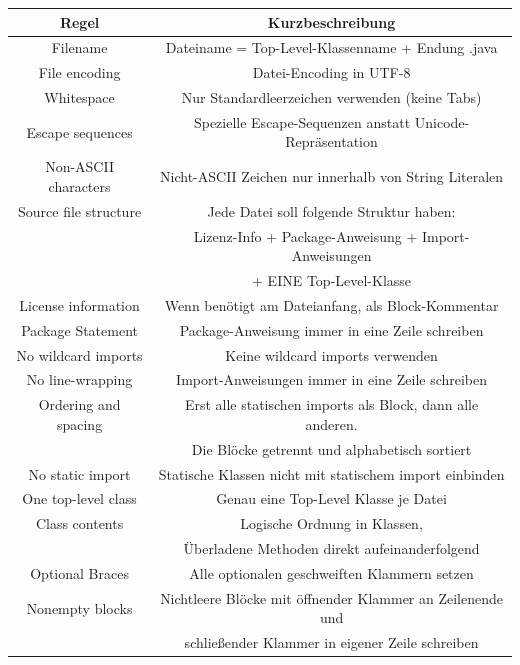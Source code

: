 \documentclass[da,ngerman]{stthesis}
\begin{document}
				\begin{center}
					\tabulinesep=1.5mm
					\begin{longtabu}{|c|c|}
						\hline
  						\textbf{Regel} & \textbf{Kurzbeschreibung}\\
  						\hline
  												\hline
						Filename & Dateiname = Top-Level-Klassenname + Endung .java \\
						\hline
						File encoding & Datei-Encoding in UTF-8 \\
						\hline
						Whitespace & Nur Standardleerzeichen verwenden (keine Tabs) \\
						\hline
						Escape sequences & Spezielle Escape-Sequenzen anstatt Unicode-Repräsentation \\
						\hline
						Non-ASCII characters & Nicht-ASCII Zeichen nur innerhalb von String Literalen \\
						\hline
						Source file structure & Jede Datei soll folgende Struktur haben: \\ & Lizenz-Info + Package-Anweisung + Import-Anweisungen \\ &  + EINE Top-Level-Klasse \\
						\hline
						License information & Wenn benötigt am Dateianfang, als Block-Kommentar \\
						\hline
						Package Statement & Package-Anweisung immer in eine Zeile schreiben \\
						\hline
						No wildcard imports & Keine wildcard imports verwenden \\
						\hline
						No line-wrapping & Import-Anweisungen immer in eine Zeile schreiben \\
						\hline
						Ordering and spacing & Erst alle statischen imports als Block, dann alle anderen. \\ & Die Blöcke getrennt und alphabetisch sortiert \\
						\hline
						No static import& Statische Klassen nicht mit statischem import einbinden \\
						\hline
						One top-level class& Genau eine Top-Level Klasse je Datei \\
						\hline
						Class contents & Logische Ordnung in Klassen, \\ & Überladene  Methoden direkt aufeinanderfolgend \\
						\hline
						Optional Braces & Alle optionalen geschweiften Klammern setzen \\
						\hline
						Nonempty blocks & Nichtleere Blöcke mit öffnender Klammer an Zeilenende und \\ & schließender Klammer in eigener Zeile schreiben \\

\end{longtabu}
\end{center}
\end{document}
